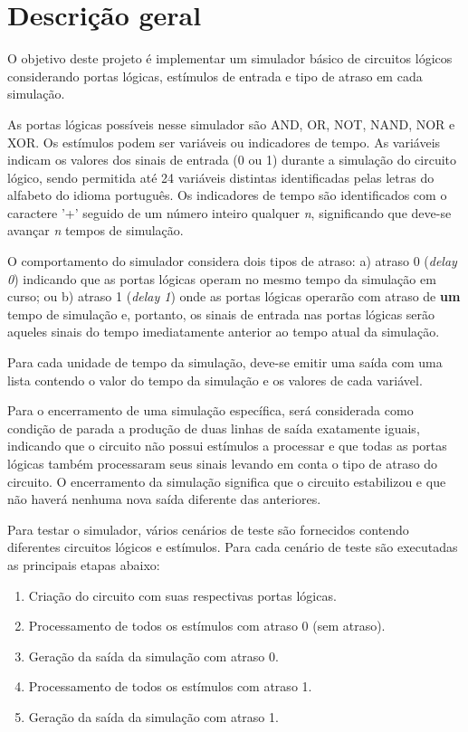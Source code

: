 
\section{Descrição geral}


O objetivo deste projeto é implementar um simulador básico de circuitos lógicos considerando portas lógicas, 
estímulos de entrada e tipo de atraso em cada simulação.

As portas lógicas possíveis nesse simulador são AND, OR, NOT, NAND, NOR e XOR. 
Os estímulos podem ser variáveis ou indicadores de tempo.
As variáveis indicam os valores dos sinais de entrada (0 ou 1)  
durante a simulação do circuito lógico, sendo permitida até 24 variáveis distintas identificadas 
pelas letras do alfabeto do idioma português. Os indicadores de tempo são identificados com o caractere '+' \space
seguido de um número inteiro qualquer \textit{n}, significando que deve-se avançar \textit{n}
tempos de simulação.

O comportamento do simulador considera dois tipos de atraso: a) atraso 0 (\textit{delay 0}) 
indicando que as portas lógicas operam no mesmo tempo da simulação em curso; ou b) atraso 1 (\textit{delay 1}) onde as portas 
lógicas operarão com atraso de \textbf{um} tempo de simulação e, portanto, os sinais de entrada nas portas lógicas 
serão aqueles sinais do tempo 
imediatamente anterior ao tempo atual da simulação.

Para cada unidade de tempo da simulação, deve-se emitir uma saída com uma lista contendo o valor do tempo da simulação
e os valores de cada variável.

Para o encerramento de uma simulação específica, será considerada como condição de parada a produção de 
duas linhas de saída exatamente 
iguais, indicando que o circuito não possui estímulos a processar e que todas as portas lógicas também processaram seus 
sinais levando em conta o tipo de atraso do circuito. O encerramento da simulação significa que o circuito 
estabilizou e que não haverá nenhuma nova saída diferente das anteriores.

Para testar o simulador, vários cenários de teste são fornecidos contendo diferentes circuitos lógicos e estímulos.
Para cada cenário de teste são executadas as principais etapas abaixo:
\begin{enumerate}
    \item Criação do circuito com suas respectivas portas lógicas.
    \item Processamento de todos os estímulos com atraso 0 (sem atraso).
    \item Geração da saída da simulação com atraso 0.
    \item Processamento de todos os estímulos com atraso 1.
    \item Geração da saída da simulação com atraso 1.
\end{enumerate}